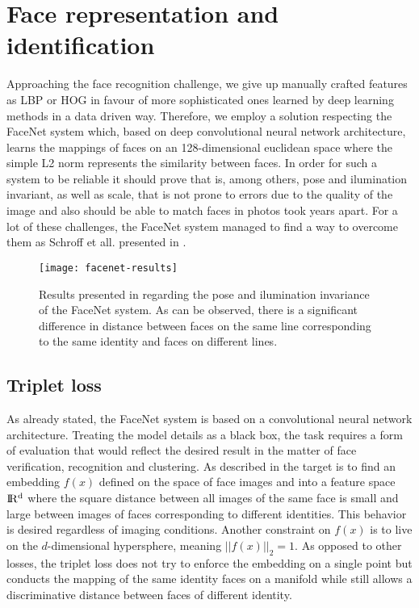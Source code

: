 \section{Face representation and identification}
Approaching the face recognition challenge, we give up manually crafted features as LBP or HOG in favour of more sophisticated ones learned by deep learning methods in a data driven way. Therefore, we employ a solution respecting the FaceNet system which, based on  deep convolutional neural network architecture, learns the mappings of faces on an 128-dimensional euclidean space where the simple L2 norm represents the similarity between faces. In order for such a system to be reliable it should prove that is, among others, pose and ilumination invariant, as well as scale, that is not prone to errors due to the quality of the image and also should be able to match faces in photos took years apart. For a lot of these challenges, the FaceNet system managed to find a way to overcome them as Schroff et all. presented in \cite{SchroffKP15}.
\begin{figure}[h]
	\begin{center}
		\texttt{[image: facenet-results]}
		\caption[FaceNet pose and ilumination invariance from \cite{SchroffKP15}]{Results presented in \cite{SchroffKP15} regarding the pose and ilumination invariance of the FaceNet system. As can be observed, there is a significant difference in distance between faces on the same line corresponding to the same identity and faces on different lines.}
	\end{center}
\end{figure}
\subsection{Triplet loss}
As already stated, the FaceNet system is based on a convolutional neural network architecture. Treating the model details as a black box, the task requires a form of evaluation that would reflect the desired result in the matter of face verification, recognition and clustering. As described in \cite{SchroffKP15} the target is to find an embedding $f(x)$ defined on the space of face images and into a feature space $\rm I\!R^{d}$ where the square distance between all images of the same face is small and large between images of faces corresponding to different identities. This behavior is desired regardless of imaging conditions. Another constraint on $f(x)$ is to live on the $d$-dimensional hypersphere, meaning $||f(x)||_{2}=1$. As opposed to other losses, the triplet loss does not try to enforce the embedding on a single point but conducts the mapping of the same identity faces on a manifold while still allows a discriminative distance between faces of different identity. 

